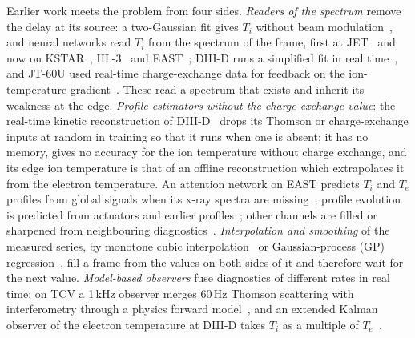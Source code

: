 \documentclass[11pt,a4paper]{article}
\newcommand{\Ti}{\ensuremath{T_i}}
\newcommand{\Te}{\ensuremath{T_e}}
\begin{document}
Earlier work meets the problem from four sides. \emph{Readers of the spectrum} remove
the delay at its source: a two-Gaussian fit gives \Ti{} without beam
modulation~\citep{Lee2020TwoGaussian}, and neural networks read \Ti{} from the spectrum of
the frame, first at
JET~\citep{Bishop1993AutomaticAnalysis,Svensson1999AnalysisJet} and now on
KSTAR~\citep{Lee2026NeuralNetworkbased}, HL-3~\citep{Tian2026RealTimeCxrs}
and EAST~\citep{Hu2026RealTimeIon}; DIII-D runs a simplified fit in real
time~\citep{Chrystal2026RealTime}, and JT-60U used real-time charge-exchange data for
feedback on the ion-temperature gradient~\citep{Yoshida2009RealTime}. These read a
spectrum that exists and inherit its weakness at the edge. \emph{Profile estimators
without the charge-exchange value}: the real-time kinetic reconstruction of
DIII-D~\citep{Shousha2023MachineLearningbased} drops its Thomson or charge-exchange inputs
at random in training so that it runs when one is absent; it has no memory, gives no
accuracy for the ion temperature without charge exchange, and its edge ion temperature is
that of an offline reconstruction which extrapolates it from the electron temperature. An
attention network on EAST predicts \Ti{} and \Te{} profiles from global signals when its
x-ray spectra are missing~\citep{Wang2026FusingGlobal}; profile evolution is predicted
from actuators and earlier profiles~\citep{Abbate2021DatadrivenProfile}; other channels
are filled or sharpened from neighbouring
diagnostics~\citep{Jalalvand2025MultimodalSuperresolution,Imrek2026TemporalSuperresolution,Wang2025TimeSeriesExtrinsic,Jia2026TimeSeries}.
\emph{Interpolation and smoothing} of the measured series, by monotone cubic
interpolation~\citep{fritsch1980} or Gaussian-process (GP)
regression~\citep{rasmussen2006,chilenski2015,michoski2024,Kim2024KineticProfile}, fill a
frame from the values on both sides of it and therefore wait for the next value.
\emph{Model-based observers} fuse diagnostics of different rates in real time: on TCV a
1\,kHz observer merges 60\,Hz Thomson scattering with interferometry through a physics
forward model~\citep{Pastore2023ModelBased,Pastore2026ApplicationsNovel}, and an extended
Kalman observer of the electron temperature at DIII-D takes \Ti{} as a multiple of
\Te{}~\citep{Morosohk2023RealTime}.
\end{document}
